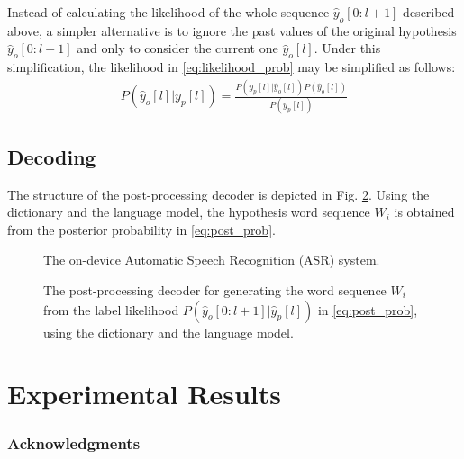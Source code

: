 \documentclass{article}
\begin{document}
Instead of calculating the likelihood of the whole sequence 
$\hat{y}_o[0:l+1]$ described above, a simpler alternative is to ignore
the past values of the original hypothesis $\hat{y}_o[0:l+1]$ and only to
consider the current one $\hat{y}_o[l]$. Under this simplification,
the likelihood in \eqref{eq:likelihood_prob} may be simplified as follows:
\begin{align}
  P(\hat{y}_o[l] \big| y_p[l]) 
    = \frac{P (y_p[l] \big| \hat{y}_o[l]) P(\hat{y}_o[l])}{P(y_p[l])} 
\end{align}

\subsection{Decoding}
\label{sec:decoding}
The structure of the post-processing decoder is depicted in Fig.
\ref{fig:post_processing_decoder}. Using the dictionary and the
language model, the hypothesis word sequence $W_i$ is obtained
from the posterior probability in \eqref{eq:post_prob}.





\begin{figure}
  \centering
    \centering
    \resizebox{55mm}{!}{
      
    }
    \caption {
      The on-device Automatic Speech Recognition (ASR) system.
      \label{fig:asr_system}
    }
\end{figure}


\begin{figure}
    \centering
    \resizebox{70mm}{!}{
      
    } 
    \caption {
      The post-processing decoder for generating the word sequence $W_i$
      from the label likelihood $P(\hat{y}_o[0:l+1] | \hat{y}_p[l])$ in \eqref{eq:post_prob}, 
      using the dictionary and the language model.
      \label{fig:post_processing_decoder}
    }
\end{figure}




\section{Experimental Results}
\label{sec:experimental_results}


\subsubsection*{Acknowledgments}



\small

\clearpage
\newpage


\end{document}
